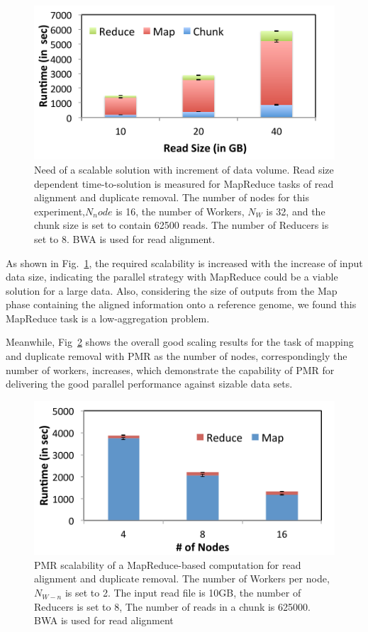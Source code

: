 \documentclass{sig-alternate}
\begin{document}
 \begin{figure}
 \centering
\includegraphics[scale=0.50]{figures/pj-smr-tts.pdf} 
\caption{\small Need of a scalable solution with increment of data volume.  Read size dependent time-to-solution is measured for MapReduce tasks of read alignment and duplicate removal.  The number of nodes for this experiment,$N_node$ is 16, the number of Workers, $N_W$ is 32, and the chunk size is set to contain 62500 reads.  The number of Reducers is set to 8. BWA is used for read alignment.}
  \label{fig:read-size} 
\end{figure}

As shown in Fig.~\ref{fig:read-size}, the required scalability is increased with the increase of input data size, indicating the parallel strategy with MapReduce could be a viable solution for a large data.  Also, considering the size of outputs from the Map phase containing the aligned information onto a reference genome, we found this MapReduce task is a low-aggregation problem.  

Meanwhile, Fig~\ref{fig:scale-p-saga-mr} shows the overall good scaling results for the task of mapping and duplicate removal with PMR as the number of nodes, correspondingly the number of workers, increases, which demonstrate the capability of PMR for delivering the good parallel performance against sizable data sets.





\begin{figure}
 \centering
\includegraphics[scale=0.50]{figures/pj-smr-scale.pdf}
\caption{\small PMR scalability of a MapReduce-based computation for read alignment and duplicate removal.  The number of Workers per node, $N_{W-n}$ is set to 2.   The input read file is 10GB, the number of Reducers is set to 8, The number of reads in a chunk is 625000. BWA is used for read alignment}
  \label{fig:scale-p-saga-mr} 
\end{figure}
\end{document}
